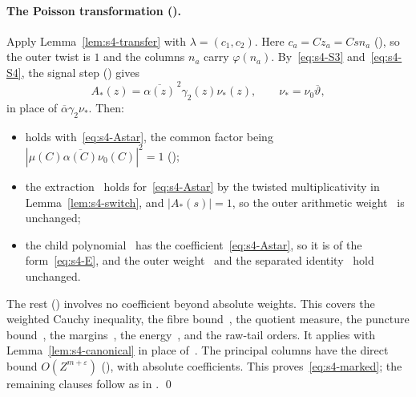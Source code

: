 \documentclass[11pt]{article}
\numberwithin{equation}{section}
\begin{document}
\paragraph{The Poisson transformation (\cite[proof of Lemma~17.1]{OAI78}).} Apply Lemma~\ref{lem:s4-transfer} with $\lambda=(c_1,c_2)$.
Here $c_a=Cz_a=Csn_a$ (\cite[proof of Lemma~17.1]{OAI78}), so the outer twist is $1$ and the columns $n_a$ carry
$\varphi(n_a)$. By~\eqref{eq:s4-S3} and~\eqref{eq:s4-S4}, the signal step (\cite[proof of Lemma~17.1]{OAI78}) gives
\begin{equation}\label{eq:s4-Astar}
 A_*(z)=\overline{\alpha(z)}^{\,2}\gamma_2(z)\nu_*(z),\qquad\nu_*=\nu_0\overline\vartheta,
\end{equation}
in place of $\overline\alpha\gamma_2\nu_*$. Then:
\begin{itemize}
\item \cite[eq.~(17.71)]{OAI78} holds with~\eqref{eq:s4-Astar}, the common factor being
 $|\mu(C)\overline{\alpha(C)}\nu_0(C)|^2=1$ (\cite[proof of Lemma~17.1]{OAI78});
\item the extraction~\cite[eq.~(17.72)]{OAI78} holds for~\eqref{eq:s4-Astar} by the
 twisted multiplicativity in Lemma~\ref{lem:s4-switch}, and $|A_*(s)|=1$, so the outer
 arithmetic weight~\cite[eq.~(17.73)]{OAI78} is unchanged;
\item the child polynomial~\cite[eq.~(17.77)]{OAI78} has the coefficient~\eqref{eq:s4-Astar},
 so it is of the form~\eqref{eq:s4-E}, and the outer weight~\cite[eq.~(17.78)]{OAI78} and the
 separated identity~\cite[eq.~(17.79)]{OAI78} hold unchanged.
\end{itemize}
The rest (\cite[proof of Lemma~17.1]{OAI78}) involves no coefficient beyond absolute weights. This covers the weighted Cauchy
inequality, the fibre bound~\cite[eq.~(17.80)]{OAI78}, the quotient measure, the puncture
bound~\cite[eq.~(17.84)]{OAI78}, the margins~\cite[eq.~(17.85)]{OAI78}, the
energy~\cite[eq.~(17.86)]{OAI78}, and the raw-tail orders. It applies with
Lemma~\ref{lem:s4-canonical} in place of~\cite[Lemma~17.2]{OAI78}. The principal columns have the
direct bound $O(Z^{m+\varepsilon})$ (\cite[proof of Lemma~17.1]{OAI78}), with absolute coefficients. This proves~\eqref{eq:s4-marked};
the remaining clauses follow as in \cite[proof of Lemma~17.1]{OAI78}. \qed
\end{document}

